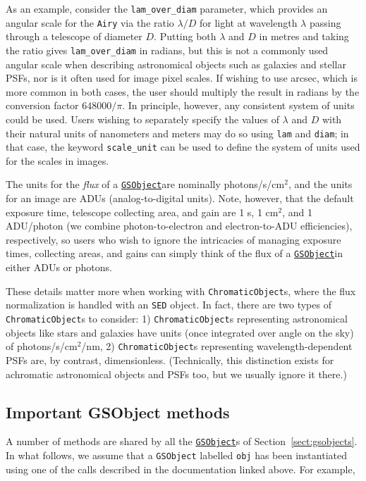 \documentclass[preprint,10pt]{../../devel/modules/aastex}
\newcommand\GSObject{\href{http://galsim-developers.github.io/GalSim/classgalsim_1_1base_1_1_g_s_object.html}{\texttt{GSObject}}}
\begin{document}
As an example, consider the
\texttt{lam\_over\_diam} parameter, which provides an angular scale for
the \texttt{Airy} via
the ratio $\lambda / D$ for light at wavelength $\lambda$ passing
through a telescope of diameter $D$. Putting both $\lambda$ and
$D$ in metres and taking the ratio gives \texttt{lam\_over\_diam} in
radians, but this is not a commonly used angular scale when describing
astronomical objects such as galaxies and stellar PSFs, nor is
it often used for image pixel scales.  If wishing to use arcsec, which
is more common in both cases, the user should multiply the result in
radians by the conversion factor
$648000 / \pi$.  In principle, however, any consistent
system of units could be used.  Users wishing to separately specify the values of $\lambda$ and $D$
with their natural units of nanometers and meters may do so using \texttt{lam} and \texttt{diam}; in
that case, the keyword \texttt{scale\_unit} can be used to define the system of units used for the
scales in images.

The units for the \textit{flux} of a \GSObject are nominally photons/s/cm$^2$, and the units for an
image are ADUs (analog-to-digital units).  Note, however, that the default exposure time, telescope
collecting area, and gain are 1 s, 1 cm$^2$, and 1 ADU/photon (we combine photon-to-electron and
electron-to-ADU efficiencies), respectively, so users who wish to ignore the intricacies of managing
exposure times, collecting areas, and gains can simply think of the flux of a \GSObject in either
ADUs or photons.

These details matter more when working with \texttt{ChromaticObject}s, where the flux normalization
is handled with an \texttt{SED} object.  In fact, there are two types of \texttt{ChromaticObject}s
to consider: 1) \texttt{ChromaticObject}s representing astronomical objects like stars and galaxies
have units (once integrated over angle on the sky) of photons/s/cm$^2$/nm, 2)
\texttt{ChromaticObject}s representing wavelength-dependent PSFs are, by contrast, dimensionless.
(Technically, this distinction exists for achromatic astronomical objects and PSFs too, but we
usually ignore it there.)


\subsection{Important GSObject methods}\label{sect:gsobjectmethods}
A number of methods are shared by all the \GSObject s of
Section~\ref{sect:gsobjects}.
In what follows, we assume that a
\texttt{GSObject} labelled \texttt{obj} has been instantiated using
one of the calls described in the documentation linked above.  For
example,
\end{document}

